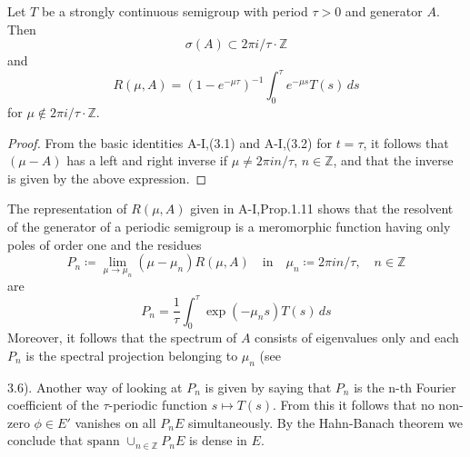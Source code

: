 \begin{lemma}\label{lem:a3-5.2}
	
	Let $T$ be a strongly continuous semigroup with period $\tau > 0$ and generator $A$.
	Then
	\[
	\sigma(A) \subset 2\pi i/\tau\cdot\mathbb{Z}
	\]
	and
	\begin{equation}\label{eq:a3-5.1}
		R(\mu,A) = (1-e^{-\mu\tau})^{-1} \int_{0}^{\tau}e^{-\mu s}T(s) \, ds
	\end{equation}
	for $\mu \notin 2\pi i/\tau\cdot\mathbb{Z}$.
\end{lemma}

\begin{proof}
	From the basic identities A-I,(3.1) and A-I,(3.2) for $t = \tau$, it follows that $(\mu - A)$ has a left and right inverse if $\mu \neq 2\pi in/\tau$, $n \in \mathbb{Z}$, and that the inverse is given by the above expression.
\end{proof}

The representation of $R(\mu,A)$ given in A-I,Prop.1.11 shows that the resolvent of the generator of a periodic semigroup is a meromorphic function having only poles of order one and the residues
\[
P_{n} \coloneqq \lim_{\mu \to \mu_{n}} (\mu-\mu_{n})R(\mu,A) \quad \text{in} \quad \mu_{n} \coloneqq 2\pi in/\tau, \quad n \in \mathbb{Z}
\]
are
\begin{equation}\label{eq:a3-5.2}
	P_{n} = \frac{1}{\tau}\int_{0}^{\tau}\exp(-\mu_{n}s)T(s) \, ds
\end{equation}
Moreover, it follows that the spectrum of $A$ consists of eigenvalues only and each $P_{n}$ is the spectral projection belonging to $\mu_{n}$ (see



\newpage
3.6). Another way of looking at $P_{n}$ is given by saying that $P_{n}$ is the n-th Fourier coefficient of the $\tau$-periodic function $s \mapsto T(s)$.
From this it follows that no non-zero $\phi \in E'$ vanishes on all $P_{n}E$ simultaneously.
By the Hahn-Banach theorem we conclude that $\text{spann } \cup_{n \in \mathbb{Z}} P_{n}E$ is dense in $E$.

